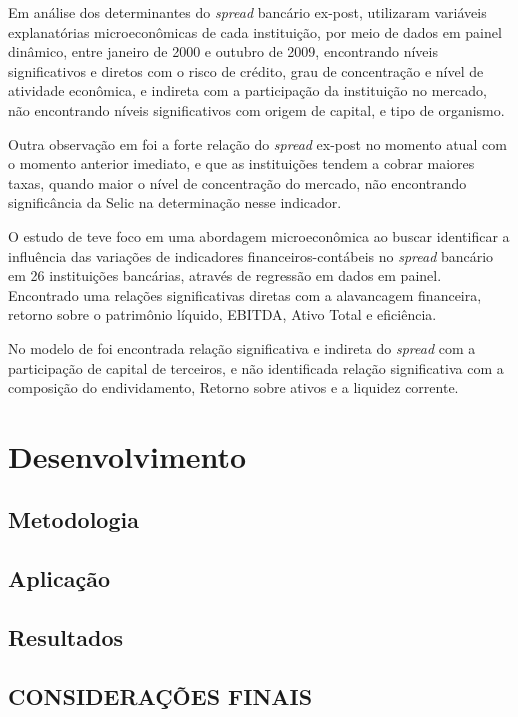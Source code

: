 \documentclass[12pt,openright,oneside,a4paper,chapter=TITLE,section=TITLE,subsection=Title,english,french,spanish,portugues,sumario=tradicional]{04-class-files/abntex2}
\begin{document}
Em análise dos determinantes do \emph{spread} bancário ex-post, \textcite{dantas:2012} utilizaram variáveis explanatórias microeconômicas de cada instituição, por meio de dados em painel dinâmico, entre janeiro de 2000 e outubro de 2009, encontrando níveis significativos e diretos com o risco de crédito, grau de concentração e nível de atividade econômica, e indireta com a participação da instituição no mercado, não encontrando níveis significativos com origem de capital, e tipo de organismo.

Outra observação em \textcite{dantas:2012} foi a forte relação do \emph{spread} ex-post no momento atual com o momento anterior imediato, e que as instituições tendem a cobrar maiores taxas, quando maior o nível de concentração do mercado, não encontrando significância da Selic na determinação nesse indicador.

O estudo de \textcite{timotio:2018} teve foco em uma abordagem microeconômica ao buscar identificar a influência das variações de indicadores financeiros-contábeis no \emph{spread} bancário em 26 instituições bancárias, através de regressão em dados em painel. Encontrado uma relações significativas diretas com a alavancagem financeira, retorno sobre o patrimônio líquido, EBITDA, Ativo Total e eficiência.

No modelo de \textcite{timotio:2018} foi encontrada relação significativa e indireta do \emph{spread} com a participação de capital de terceiros, e não identificada relação significativa com a composição do endividamento, Retorno sobre ativos e a liquidez corrente.

\part{Desenvolvimento}

\chapter{Metodologia}

\chapter{Aplicação}

\chapter{Resultados}


\chapter*[Conclusão]{CONSIDERAÇÕES FINAIS}
\end{document}
